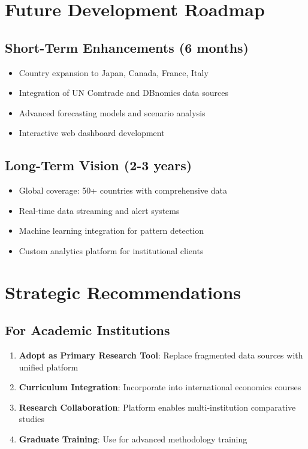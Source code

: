 \documentclass[11pt,a4paper]{article}
\begin{document}
\section{Future Development Roadmap}

\subsection{Short-Term Enhancements (6 months)}
\begin{itemize}
    \item Country expansion to Japan, Canada, France, Italy
    \item Integration of UN Comtrade and DBnomics data sources
    \item Advanced forecasting models and scenario analysis
    \item Interactive web dashboard development
\end{itemize}

\subsection{Long-Term Vision (2-3 years)}
\begin{itemize}
    \item Global coverage: 50+ countries with comprehensive data
    \item Real-time data streaming and alert systems
    \item Machine learning integration for pattern detection
    \item Custom analytics platform for institutional clients
\end{itemize}

\section{Strategic Recommendations}

\subsection{For Academic Institutions}
\begin{enumerate}
    \item \textbf{Adopt as Primary Research Tool}: Replace fragmented data sources with unified platform
    \item \textbf{Curriculum Integration}: Incorporate into international economics courses
    \item \textbf{Research Collaboration}: Platform enables multi-institution comparative studies
    \item \textbf{Graduate Training}: Use for advanced methodology training
\end{enumerate}
\end{document}

